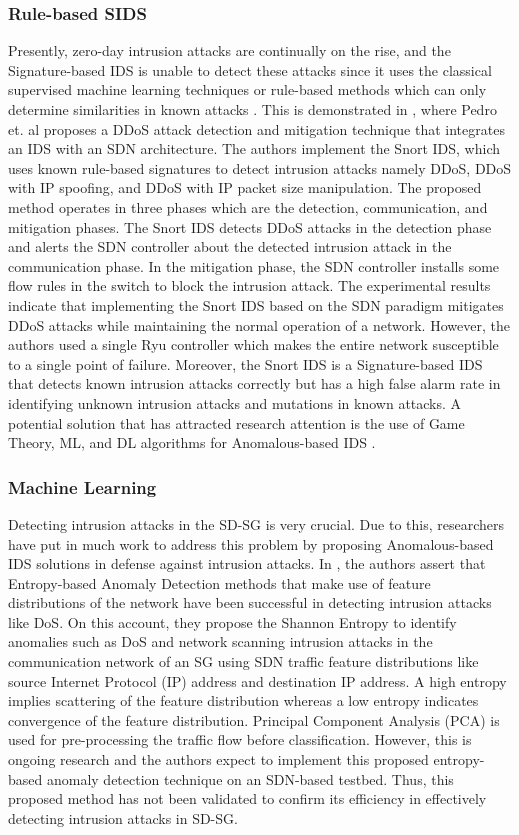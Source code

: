 \documentclass[conference]{IEEEtran}
\begin{document}
\subsubsection{Rule-based SIDS}
Presently, zero-day intrusion attacks are continually on the rise, and the Signature-based IDS is unable to detect these attacks since it uses the classical supervised machine learning techniques or rule-based methods which can only determine similarities in known attacks \cite{Khraisat2019SurveyOI}. This is demonstrated in \cite{info10030106}, where Pedro et. al proposes a DDoS attack detection and mitigation technique that integrates an IDS with an SDN architecture. The authors implement the Snort IDS, which uses known rule-based signatures to detect intrusion attacks namely DDoS, DDoS with IP spoofing, and DDoS with IP packet size manipulation. The proposed method operates in three phases which are the detection, communication, and mitigation phases. The Snort IDS detects DDoS attacks in the detection phase and alerts the SDN controller about the detected intrusion attack in the communication phase. In the mitigation phase, the SDN controller installs some flow rules in the switch to block the intrusion attack. The experimental results indicate that implementing the Snort IDS based on the SDN paradigm mitigates DDoS attacks while maintaining the normal operation of a network. However, the authors used a single Ryu controller which makes the entire network susceptible to a single point of failure. Moreover, the Snort IDS is a Signature-based IDS that detects known intrusion attacks correctly but has a high false alarm rate in identifying unknown intrusion attacks and mutations in known attacks. A potential solution that has attracted research attention is the use of Game Theory, ML, and DL algorithms for Anomalous-based IDS \cite{9664737}. 

\subsubsection{Machine Learning}
Detecting intrusion attacks in the SD-SG is very crucial. Due to this, researchers have put in much work to address this problem by proposing Anomalous-based IDS solutions in defense against intrusion attacks. In \cite{jung2019anomaly}, the authors assert that Entropy-based Anomaly Detection methods that make use of feature distributions of the network have been successful in detecting intrusion attacks like DoS. On this account, they propose the Shannon Entropy to identify anomalies such as DoS and network scanning intrusion attacks in the communication network of an SG using SDN traffic feature distributions like source Internet Protocol (IP) address and destination IP address. A high entropy implies scattering of the feature distribution whereas a low entropy indicates convergence of the feature distribution. Principal Component Analysis (PCA) is used for pre-processing the traffic flow before classification. However, this is ongoing research and the authors expect to implement this proposed entropy-based anomaly detection technique on an SDN-based testbed. Thus, this proposed method has not been validated to confirm its efficiency in effectively detecting intrusion attacks in SD-SG.
\end{document}
